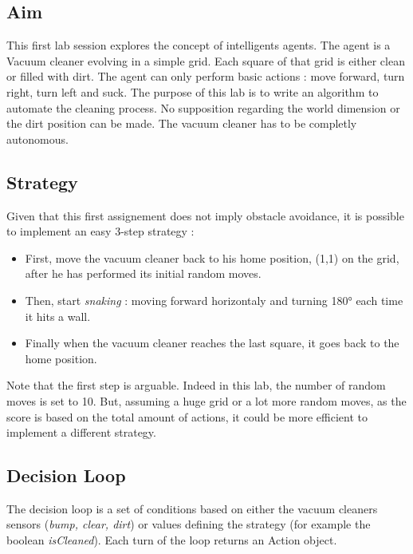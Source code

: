  \addtocounter{section}{1}
 \thispagestyle{empty}
\subsection{Aim}

This first lab session explores the concept of intelligents agents. The agent is a
Vacuum cleaner evolving in a simple grid. Each square of that grid is either clean
or filled with dirt. The agent can only perform basic actions :
move forward, turn right, turn left and suck.
The purpose of this lab is to write an algorithm to automate the cleaning process.
No supposition regarding the world dimension or the dirt position can be made.
The vacuum cleaner has to be completly autonomous.
\subsection{Strategy}
Given that this first assignement does not imply obstacle avoidance, it is possible
to implement an easy 3-step strategy :

\begin{itemize}
  \item First, move the vacuum cleaner back to his home position, (1,1) on the
grid, after he has performed its initial random moves.
  \item Then, start \textit{snaking} : moving forward horizontaly and
turning 180° each time it hits a wall.
  \item Finally when the vacuum cleaner reaches the last square, it goes back to the home
  position.
\end{itemize}

Note that the first step is arguable. Indeed in this lab, the number of random
moves is set to 10. But, assuming a huge grid or a lot more random moves, as the
score is based on the total amount of actions, it could be more efficient
to implement a different strategy.

\subsection{Decision Loop}

The decision loop is a set of conditions based on either the vacuum cleaners sensors
(\textit{bump, clear, dirt}) or values defining the strategy (for example the boolean \textit{isCleaned}).
Each turn of the loop returns an Action object.

